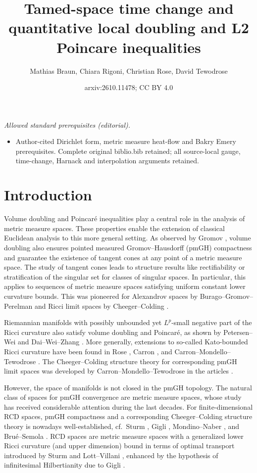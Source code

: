 \documentclass[10pt]{article}
\title{Tamed-space time change and quantitative local doubling and L2 Poincare inequalities}
\author{Mathias Braun, Chiara Rigoni, Christian Rose, David Tewodrose}
\date{arxiv:2610.11478; CC BY 4.0}
\theoremstyle{plain}
\theoremstyle{definition}
\begin{document}
\maketitle
\noindent\textit{Allowed standard prerequisites (editorial).}\begin{itemize}
\item Author-cited Dirichlet form, metric measure heat-flow and Bakry Emery prerequisites. Complete original biblio.bib retained; all source-local gauge, time-change, Harnack and interpolation arguments retained.
\end{itemize}\medskip
\section{Introduction}


Volume doubling and Poincaré inequalities play a central role in the analysis of metric measure spaces. These properties enable the extension of classical Euclidean analysis to this more general setting. As observed by Gromov \cite{Gromov}, volume doubling also ensures pointed measured Gromov--Hausdorff (pmGH) compactness and guarantee the existence of tangent cones at any point of a metric measure space. The study of tangent cones leads to structure results like rectifiability or stratification of the singular set for classes of singular spaces. In particular, this applies to sequences of metric measure spaces satisfying uniform constant lower curvature bounds. This was pioneered for Alexandrov spaces by Burago--Gromov--Perelman \cite{BuragoGromovPerelman} and Ricci limit spaces by Cheeger--Colding \cite{ChCo97}.


Riemannian manifolds with possibly unbounded yet $L^p$-small negative part of the Ricci curvature also satisfy volume doubling and Poincar\'e, as shown by Petersen--Wei \cite{PW1} and Dai--Wei--Zhang \cite{DWZ18}. More generally, extensions to so-called Kato-bounded Ricci curvature have been found in Rose \cite{Rose19}, Carron \cite{Carron-19}, and Carron--Mondello--Tewodrose \cite{CMT_KatoBE}. The Cheeger--Colding structure theory for corresponding pmGH limit spaces was developed by Carron--Mondello--Tewodrose in the articles \cite{CMT,CMT2,CMT_KatoBE}. 


However, the space of manifolds is not closed in the pmGH topology. The natural class of spaces for pmGH convergence are metric measure spaces, whose study has received considerable attention during the last decades. For finite-dimensional RCD spaces, pmGH compactness and a corresponding Cheeger--Colding structure theory is nowadays well-established, cf.~Sturm \cite{sturm2006-ii}, Gigli \cite{gigli-splitting}, Mondino--Naber \cite{MondinoNaber}, and Brué--Semola \cite{BrueSemola}. RCD spaces are metric measure spaces with a generalized lower Ricci curvature (and upper dimension) bound in terms of optimal transport introduced by Sturm \cite{sturm2006-i,sturm2006-ii} and Lott--Villani \cite{lott-villani2009}, enhanced by the hypothesis of infinitesimal Hilbertianity due to Gigli \cite{Gigli15}. 
\end{document}
